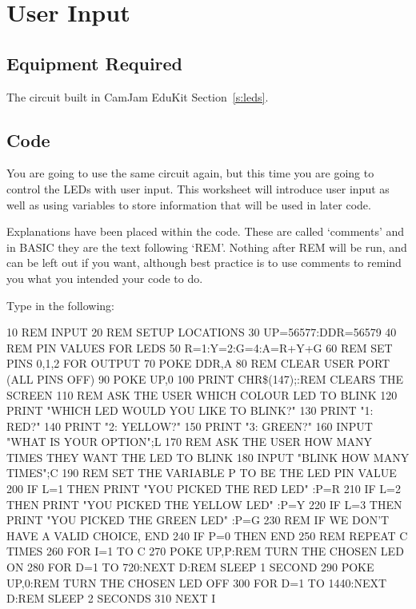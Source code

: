 \section{User Input}


\subsection*{Equipment Required}

The circuit built in CamJam EduKit Section~\ref{s:leds}.

\subsection*{Code}

You are going to use the same circuit again, but this time you are going to control the LEDs with user input.  This worksheet will introduce user input as well as using variables to store information that will be used in later code.

Explanations have been placed within the code.  These are called `comments' and in BASIC they are the text following `REM'.  Nothing after REM will be run, and can be left out if you want, although best practice is to use comments to remind you what you intended your code to do.

Type in the following:
\begin{basic}
10 REM INPUT
20 REM SETUP LOCATIONS
30 UP=56577:DDR=56579
40 REM PIN VALUES FOR LEDS
50 R=1:Y=2:G=4:A=R+Y+G
60 REM SET PINS 0,1,2 FOR OUTPUT
70 POKE DDR,A
80 REM CLEAR USER PORT (ALL PINS OFF)
90 POKE UP,0
100 PRINT CHR\$(147);:REM CLEARS THE SCREEN
110 REM ASK THE USER WHICH COLOUR LED TO BLINK
120 PRINT "WHICH LED WOULD YOU LIKE TO BLINK?"
130 PRINT "1: RED?"
140 PRINT "2: YELLOW?"
150 PRINT "3: GREEN?"
160 INPUT "WHAT IS YOUR OPTION";L
170 REM ASK THE USER HOW MANY TIMES THEY WANT THE
    LED TO BLINK
180 INPUT "BLINK HOW MANY TIMES";C
190 REM SET THE VARIABLE P TO BE THE LED PIN
    VALUE
200 IF L=1 THEN PRINT "YOU PICKED THE RED LED"
    :P=R
210 IF L=2 THEN PRINT "YOU PICKED THE YELLOW LED"
    :P=Y
220 IF L=3 THEN PRINT "YOU PICKED THE GREEN LED"
    :P=G
230 REM IF WE DON'T HAVE A VALID CHOICE, END
240 IF P=0 THEN END
250 REM REPEAT C TIMES
260 FOR I=1 TO C
270 POKE UP,P:REM TURN THE CHOSEN LED ON
280 FOR D=1 TO 720:NEXT D:REM SLEEP 1 SECOND
290 POKE UP,0:REM TURN THE CHOSEN LED OFF
300 FOR D=1 TO 1440:NEXT D:REM SLEEP 2 SECONDS
310 NEXT I
\end{basic}

